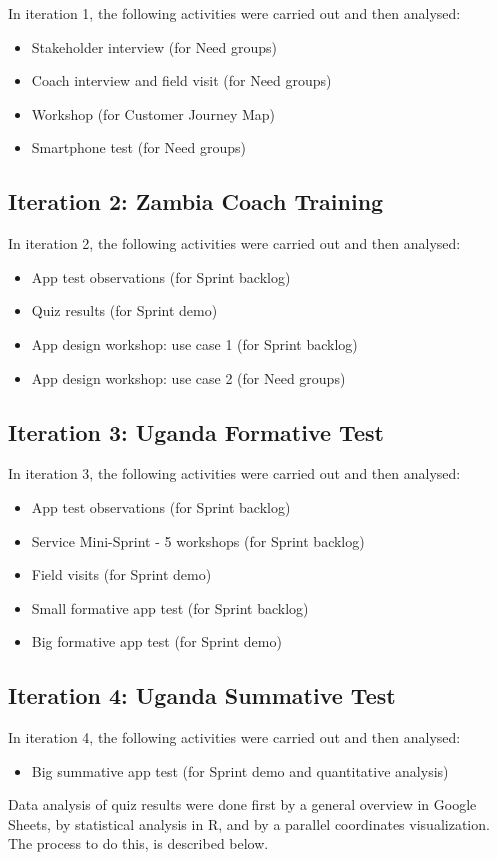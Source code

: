In iteration 1, the following activities were carried out and then analysed:

\begin{itemize}
\item Stakeholder interview (for Need groups)
\item Coach interview and field visit (for Need groups)
\item Workshop (for Customer Journey Map)
\item Smartphone test (for Need groups)
\end{itemize}

\subsection{Iteration 2: Zambia Coach Training}

In iteration 2, the following activities were carried out and then analysed:

\begin{itemize}
\item App test observations (for Sprint backlog)
\item Quiz results (for Sprint demo)
\item App design workshop: use case 1 (for Sprint backlog)
\item App design workshop: use case 2 (for Need groups)
\end{itemize}

\subsection{Iteration 3: Uganda Formative Test}

In iteration 3, the following activities were carried out and then analysed:

\begin{itemize}
\item App test observations (for Sprint backlog)
\item Service Mini-Sprint - 5 workshops (for Sprint backlog)
\item Field visits (for Sprint demo)
\item Small formative app test (for Sprint backlog)
\item Big formative app test (for Sprint demo)
\end{itemize}

\subsection{Iteration 4: Uganda Summative Test}

In iteration 4, the following activities were carried out and then analysed:

\begin{itemize}
\item Big summative app test (for Sprint demo and quantitative analysis)
\end{itemize}

Data analysis of quiz results were done first by a general overview in Google Sheets, by statistical analysis in R, and by a parallel coordinates visualization. The process to do this, is described below.


